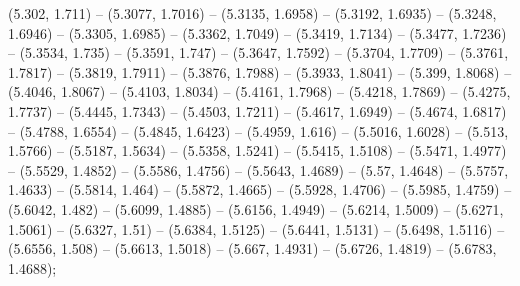 (5.302, 1.711) -- (5.3077, 1.7016) -- (5.3135, 1.6958) -- (5.3192, 1.6935) -- (5.3248, 1.6946) -- (5.3305, 1.6985) -- (5.3362, 1.7049) -- (5.3419, 1.7134) -- (5.3477, 1.7236) -- (5.3534, 1.735) -- (5.3591, 1.747) -- (5.3647, 1.7592) -- (5.3704, 1.7709) -- (5.3761, 1.7817) -- (5.3819, 1.7911) -- (5.3876, 1.7988) -- (5.3933, 1.8041) -- (5.399, 1.8068) -- (5.4046, 1.8067) -- (5.4103, 1.8034) -- (5.4161, 1.7968) -- (5.4218, 1.7869) -- (5.4275, 1.7737) -- (5.4445, 1.7343) -- (5.4503, 1.7211) -- (5.4617, 1.6949) -- (5.4674, 1.6817) -- (5.4788, 1.6554) -- (5.4845, 1.6423) -- (5.4959, 1.616) -- (5.5016, 1.6028) -- (5.513, 1.5766) -- (5.5187, 1.5634) -- (5.5358, 1.5241) -- (5.5415, 1.5108) -- (5.5471, 1.4977) -- (5.5529, 1.4852) -- (5.5586, 1.4756) -- (5.5643, 1.4689) -- (5.57, 1.4648) -- (5.5757, 1.4633) -- (5.5814, 1.464) -- (5.5872, 1.4665) -- (5.5928, 1.4706) -- (5.5985, 1.4759) -- (5.6042, 1.482) -- (5.6099, 1.4885) -- (5.6156, 1.4949) -- (5.6214, 1.5009) -- (5.6271, 1.5061) -- (5.6327, 1.51) -- (5.6384, 1.5125) -- (5.6441, 1.5131) -- (5.6498, 1.5116) -- (5.6556, 1.508) -- (5.6613, 1.5018) -- (5.667, 1.4931) -- (5.6726, 1.4819) -- (5.6783, 1.4688);



